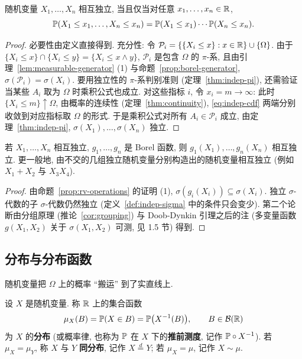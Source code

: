 \begin{theorem}[独立性的分布函数判别法]\label{thm:indep-cdf}
随机变量 $X_1,\dots,X_n$ 相互独立, 当且仅当对任意 $x_1,\dots,x_n\in\R$,
\begin{equation}\label{eq:indep-cdf}
\P(X_1\le x_1,\dots,X_n\le x_n)=\P(X_1\le x_1)\cdots\P(X_n\le x_n).
\end{equation}
\end{theorem}

\begin{proof}
必要性由定义直接得到. 充分性: 令 $\mathcal{P}_i=\{\{X_i\le x\}: x\in\R\}\cup\{\Omega\}$. 由于 $\{X_i\le x\}\cap\{X_i\le y\}=\{X_i\le x\wedge y\}$, $\mathcal{P}_i$ 是包含 $\Omega$ 的 $\pi$-系, 且由引理~\ref{lem:measurable-generator} (1) 与命题~\ref{prop:borel-generator}, $\sigma(\mathcal{P}_i)=\sigma(X_i)$. 要用独立性的 $\pi$-系判别准则 (定理~\ref{thm:indep-pi}), 还需验证当某些 $A_i$ 取为 $\Omega$ 时乘积公式也成立. 对这些指标 $i$, 令 $x_i=m\to\infty$: 此时 $\{X_i\le m\}\uparrow\Omega$, 由概率的连续性 (定理~\ref{thm:continuity}), \eqref{eq:indep-cdf} 两端分别收敛到对应指标取 $\Omega$ 的形式. 于是乘积公式对所有 $A_i\in\mathcal{P}_i$ 成立, 由定理~\ref{thm:indep-pi}, $\sigma(X_1),\dots,\sigma(X_n)$ 独立.
\end{proof}

\begin{proposition}\label{prop:indep-functions}
若 $X_1,\dots,X_n$ 相互独立, $g_1,\dots,g_n$ 是 Borel 函数, 则 $g_1(X_1),\dots,g_n(X_n)$ 相互独立. 更一般地, 由不交的几组独立随机变量分别构造出的随机变量相互独立 (例如 $X_1+X_2$ 与 $X_3X_4$).
\end{proposition}

\begin{proof}
由命题~\ref{prop:rv-operations} 的证明 (1), $\sigma(g_i(X_i))\subseteq\sigma(X_i)$. 独立 $\sigma$-代数的子 $\sigma$-代数仍然独立 (定义~\ref{def:indep-sigma} 中的条件只会变少). 第二个论断由分组原理 (推论~\ref{cor:grouping}) 与 Doob-Dynkin 引理之后的注 (多变量函数 $g(X_1,X_2)$ 关于 $\sigma(X_1,X_2)$ 可测, 见 1.5 节) 得到.
\end{proof}

\subsection{分布与分布函数}

随机变量把 $\Omega$ 上的概率 ``搬运'' 到了实直线上.

\begin{definition}[分布]\label{def:distribution}
设 $X$ 是随机变量. 称 $\R$ 上的集合函数
\[
\mu_X(B)=\P(X\in B)=\P\big(X^{-1}(B)\big),\qquad B\in\mathcal{B}(\R)
\]
为 $X$ 的\textbf{分布} (或概率律, 也称为 $\P$ 在 $X$ 下的\textbf{推前测度}, 记作 $\P\circ X^{-1}$). 若 $\mu_X=\mu_Y$, 称 $X$ 与 $Y$ \textbf{同分布}, 记作 $X\overset{d}{=}Y$; 若 $\mu_X=\mu$, 记作 $X\sim\mu$.
\end{definition}


